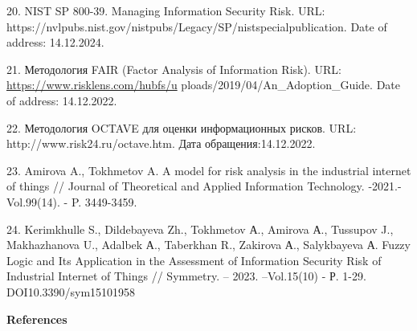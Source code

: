 \begin{references}
20. NIST SP 800-39. Managing Information Security Risk. URL:\\
https://nvlpubs.nist.gov/nistpubs/Legacy/SP/nistspecialpublication. Date
of address: 14.12.2024.

21. Методология FAIR (Factor Analysis of Information Risk). URL:
\url{https://www.risklens.com/hubfs/u}
ploads/2019/04/An\_Adoption\_Guide. Date of address: 14.12.2022.

22. Методология OCTAVE для оценки информационных рисков. URL:\\
http://www.risk24.ru/octave.htm. Дата обращения:14.12.2022.

23. Amirova A., Tokhmetov A. A model for risk analysis in the industrial
internet of things // Journal of Theoretical and Applied Information
Technology. -2021.- Vol.99(14). - P. 3449-3459.

24. Kerimkhulle S., Dildebayeva Zh., Tokhmetov А., Amirova А., Tussupov
J., Makhazhanova U., Adalbek А., Taberkhan R., Zakirova А., Salykbayeva
А. Fuzzy Logic and Its Application in the Assessment of Information
Security Risk of Industrial Internet of Things // Symmetry. -- 2023.
--Vol.15(10) - Р. 1-29. DOI10.3390/sym15101958
\end{references}

\begin{center}
{\bfseries References}
\end{center}

